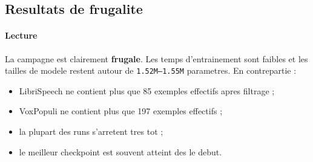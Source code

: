 \documentclass[11pt,a4paper]{article}
\begin{document}
\subsection{Resultats de frugalite}
\begin{table}[H]
\centering
\caption{Cout d'entrainement et taille des sous-ensembles apres filtrage}
\label{tab:frugality}
\end{table}

\paragraph{Lecture}
La campagne est clairement \textbf{frugale}. Les temps d'entrainement sont faibles et les tailles de modele restent autour de \texttt{1.52M--1.55M} parametres. En contrepartie :
\begin{itemize}[leftmargin=1.2cm]
\item LibriSpeech ne contient plus que 85 exemples effectifs apres filtrage ;
\item VoxPopuli ne contient plus que 197 exemples effectifs ;
\item la plupart des runs s'arretent tres tot ;
\item le meilleur checkpoint est souvent atteint des le debut.
\end{itemize}
\end{document}
